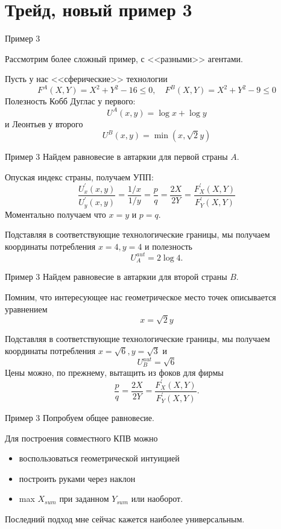 \documentclass{beamer}
\begin{document}
\section{Трейд, новый пример 3}

\begin{frame}{Пример 3}

Рассмотрим более сложный пример, с <<разными>> агентами.

Пусть у нас <<сферические>> технологии
$$ F^A(X,Y) = X^2 + Y^2 - 16 \leqslant 0, \quad F^B(X,Y) = X^2 + Y^2 - 9 \leqslant 0$$
Полезность Кобб Дуглас у первого: $$U^A(x,y) = \log x + \log y$$
и Леонтьев у второго $$U^B(x,y) = \min(x, \sqrt{2} y)$$
\end{frame}

\begin{frame}{Пример 3}
Найдем равновесие в автаркии для первой страны $A$. 

Опуская индекс страны, получаем УПП:
$$ \frac{U^{'}_x(x,y)}{U^{'}_y(x,y)} = \frac{1/x}{1/y} = \frac{p}{q} = \frac{2X}{2Y} = \frac{F^{'}_X(X,Y)}{F^{'}_Y(X,Y)}$$
Моментально получаем что $x = y$ и $p = q$.

Подставляя в соответствующие технологические границы, мы получаем координаты потребления $x = 4, y = 4$ и полезность $$U^{aut}_A = 2 \log 4.$$

\end{frame}

\begin{frame}{Пример 3}
Найдем равновесие в автаркии для второй страны $B$. 

Помним, что интересующее нас геометрическое место точек описывается уравнением
$$x = \sqrt{2} y$$

Подставляя в соответствующие технологические границы, мы получаем координаты потребления $x = \sqrt{6}, y = \sqrt{3}$ и $$U^{aut}_B = \sqrt{6}$$
Цены можно, по прежнему, вытащить из фоков для фирмы
$$ \frac{p}{q} = \frac{2X}{2Y} = \frac{F^{'}_X(X,Y)}{F^{'}_Y(X,Y)}.$$
\end{frame}

\begin{frame}{Пример 3}
Попробуем общее равновесие.

Для построения совместного КПВ можно
\begin{itemize}
  \item воспользоваться геометрической интуицией
  \item построить руками через наклон
  \item max $X_{sum}$ при заданном $Y_{sum}$ или наоборот.
\end{itemize}
Последний подход мне сейчас кажется наиболее универсальным.
\end{frame}
\end{document}
